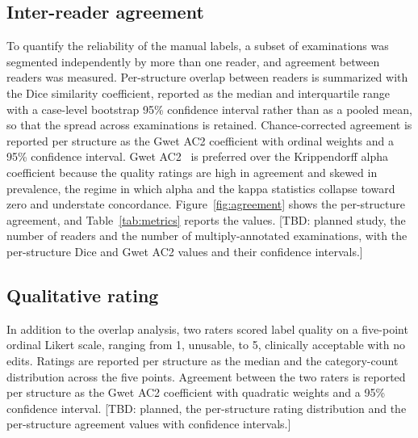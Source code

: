 \subsection*{Inter-reader agreement}\label{subsec:agreement}
To quantify the reliability of the manual labels, a subset of examinations was segmented independently by more than one reader, and agreement between readers was measured.
Per-structure overlap between readers is summarized with the Dice similarity coefficient, reported as the median and interquartile range with a case-level bootstrap 95\% confidence interval rather than as a pooled mean, so that the spread across examinations is retained.
Chance-corrected agreement is reported per structure as the Gwet AC2 coefficient with ordinal weights and a 95\% confidence interval.
Gwet AC2~\cite{Gwet_2008} is preferred over the Krippendorff alpha coefficient because the quality ratings are high in agreement and skewed in prevalence, the regime in which alpha and the kappa statistics collapse toward zero and understate concordance.
Figure~\ref{fig:agreement} shows the per-structure agreement, and Table~\ref{tab:metrics} reports the values.
[TBD: planned study, the number of readers and the number of multiply-annotated examinations, with the per-structure Dice and Gwet AC2 values and their confidence intervals.]

\subsection*{Qualitative rating}\label{subsec:likert}
In addition to the overlap analysis, two raters scored label quality on a five-point ordinal Likert scale, ranging from 1, unusable, to 5, clinically acceptable with no edits.
Ratings are reported per structure as the median and the category-count distribution across the five points.
Agreement between the two raters is reported per structure as the Gwet AC2 coefficient with quadratic weights and a 95\% confidence interval.
[TBD: planned, the per-structure rating distribution and the per-structure agreement values with confidence intervals.]

